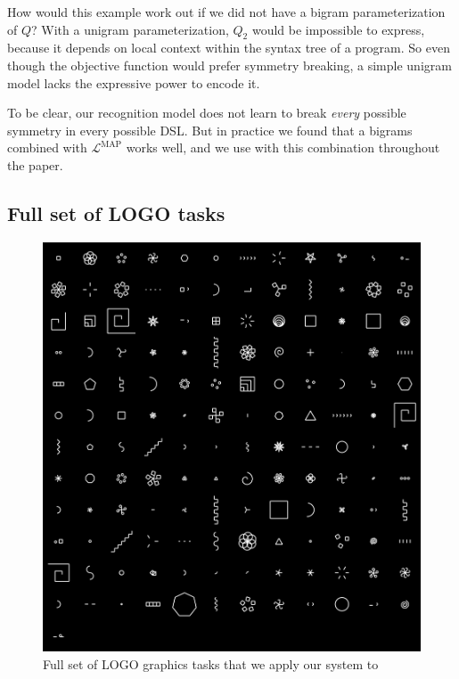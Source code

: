 \documentclass{article}
\begin{document}
How would this example work out if we did not have a bigram
parameterization of $Q$?  With a unigram parameterization, $Q_2$ would
be impossible to express, because it depends on local context within
the syntax tree of a program. So even though the objective function would prefer symmetry breaking,
a simple unigram model lacks the expressive power to
encode it.

To be clear,
our recognition model does not learn to break \emph{every} possible symmetry in every possible DSL.
But in practice we found that a bigrams combined with $\mathcal{L}^{\text{MAP}}$
works well,
and we use with this combination throughout the paper.


\subsection{Full set of LOGO  tasks}

\begin{figure}
  \includegraphics[width = \textwidth]{figures/fullLogo.png}
  \caption{Full set of LOGO graphics tasks that we apply our system to}
\end{figure}
\end{document}
